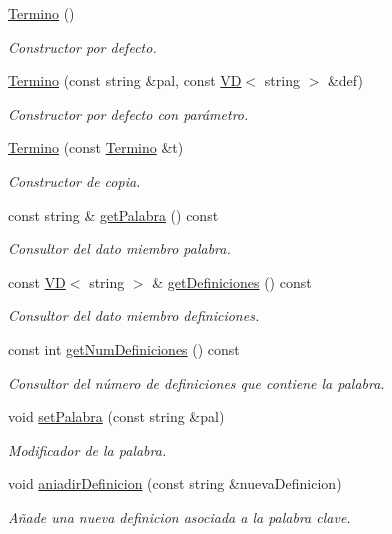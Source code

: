 \begin{DoxyCompactItemize}
\item 
\mbox{\hyperlink{class_termino_ac3b1425fec4d38d78c5d36cb5fe8e728}{Termino}} ()
\begin{DoxyCompactList}\small\item\em Constructor por defecto. \end{DoxyCompactList}\item 
\mbox{\hyperlink{class_termino_af3f809601058b89ee169ac3c47b87307}{Termino}} (const string \&pal, const \mbox{\hyperlink{class_v_d}{VD}}$<$ string $>$ \&def)
\begin{DoxyCompactList}\small\item\em Constructor por defecto con parámetro. \end{DoxyCompactList}\item 
\mbox{\hyperlink{class_termino_aca157aa3fd8d1d0e8fa49ac0855597e7}{Termino}} (const \mbox{\hyperlink{class_termino}{Termino}} \&t)
\begin{DoxyCompactList}\small\item\em Constructor de copia. \end{DoxyCompactList}\item 
const string \& \mbox{\hyperlink{class_termino_aaed2bb666fca9e956baeac5858aa7dd1}{get\+Palabra}} () const
\begin{DoxyCompactList}\small\item\em Consultor del dato miembro palabra. \end{DoxyCompactList}\item 
const \mbox{\hyperlink{class_v_d}{VD}}$<$ string $>$ \& \mbox{\hyperlink{class_termino_ab8c2a16c1d69da9bc9d178f34ad39a23}{get\+Definiciones}} () const
\begin{DoxyCompactList}\small\item\em Consultor del dato miembro definiciones. \end{DoxyCompactList}\item 
const int \mbox{\hyperlink{class_termino_aa27c2541b1445c1fe8b981786ed55a73}{get\+Num\+Definiciones}} () const
\begin{DoxyCompactList}\small\item\em Consultor del número de definiciones que contiene la palabra. \end{DoxyCompactList}\item 
void \mbox{\hyperlink{class_termino_a00c9ea9d2348f75f595f2ecf46183c4c}{set\+Palabra}} (const string \&pal)
\begin{DoxyCompactList}\small\item\em Modificador de la palabra. \end{DoxyCompactList}\item 
void \mbox{\hyperlink{class_termino_af65b85bcfa0d7514bffa2f01f529fd9a}{aniadir\+Definicion}} (const string \&nueva\+Definicion)
\begin{DoxyCompactList}\small\item\em Añade una nueva definicion asociada a la palabra clave. \end{DoxyCompactList}\end{DoxyCompactItemize}
